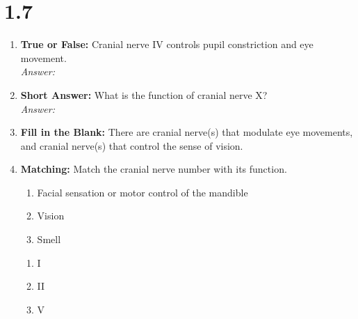 \section*{1.7}
\begin{enumerate}[label=\textbf{Q1.7.\arabic*}]



      \item \textbf{True or False:} Cranial nerve IV controls pupil constriction and eye movement. \\
            \textit{Answer:} %

      \item \textbf{Short Answer:} What is the function of cranial nerve X? \\
            \textit{Answer:} \\ %

      \item \textbf{Fill in the Blank:} There are \underline{\hspace{3cm}} cranial nerve(s) that modulate eye movements, and \underline{\hspace{3cm}} cranial nerve(s) that control the sense of vision. \\

      \item \textbf{Matching:} Match the cranial nerve number with its function.
      \begin{wordbox}
            \begin{enumerate}[label=(\roman*)]
                  \item Facial sensation or motor control of the mandible
                  \item Vision
                  \item Smell
            \end{enumerate}
      \end{wordbox}
      \begin{enumerate}[label=(\alph*)]
            \item I \quad \dotfill \quad \underline{\hspace{3cm}}\\[0.5em]
            \item II \quad \dotfill \quad \underline{\hspace{3cm}}\\[0.5em]
            \item V \quad \dotfill \quad \underline{\hspace{3cm}}
      \end{enumerate}


\end{enumerate}
